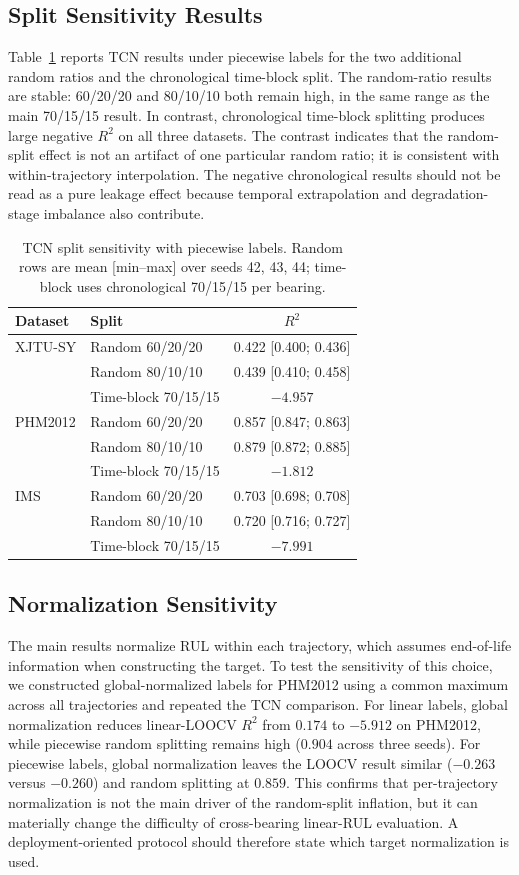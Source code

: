 \documentclass[pdflatex,sn-mathphys-num]{sn-jnl}
\begin{document}
\subsection{Split Sensitivity Results}
Table~\ref{tab:sensitivity} reports TCN results under piecewise labels for the two additional random ratios and the chronological time-block split. The random-ratio results are stable: 60/20/20 and 80/10/10 both remain high, in the same range as the main 70/15/15 result. In contrast, chronological time-block splitting produces large negative $R^2$ on all three datasets. The contrast indicates that the random-split effect is not an artifact of one particular random ratio; it is consistent with within-trajectory interpolation. The negative chronological results should not be read as a pure leakage effect because temporal extrapolation and degradation-stage imbalance also contribute.

\begin{table}[t]
\centering
\caption{TCN split sensitivity with piecewise labels. Random rows are mean [min--max] over seeds 42, 43, 44; time-block uses chronological 70/15/15 per bearing.}
\label{tab:sensitivity}
\small
\begin{tabular}{llc}
\toprule
Dataset & Split & $R^2$ \\
\midrule
XJTU-SY & Random 60/20/20 & 0.422 [0.400; 0.436] \\
 & Random 80/10/10 & 0.439 [0.410; 0.458] \\
 & Time-block 70/15/15 & $-4.957$ \\
\midrule
PHM2012 & Random 60/20/20 & 0.857 [0.847; 0.863] \\
 & Random 80/10/10 & 0.879 [0.872; 0.885] \\
 & Time-block 70/15/15 & $-1.812$ \\
\midrule
IMS & Random 60/20/20 & 0.703 [0.698; 0.708] \\
 & Random 80/10/10 & 0.720 [0.716; 0.727] \\
 & Time-block 70/15/15 & $-7.991$ \\
\bottomrule
\end{tabular}
\end{table}


\subsection{Normalization Sensitivity}
The main results normalize RUL within each trajectory, which assumes end-of-life information when constructing the target. To test the sensitivity of this choice, we constructed global-normalized labels for PHM2012 using a common maximum across all trajectories and repeated the TCN comparison. For linear labels, global normalization reduces linear-LOOCV $R^2$ from $0.174$ to $-5.912$ on PHM2012, while piecewise random splitting remains high ($0.904$ across three seeds). For piecewise labels, global normalization leaves the LOOCV result similar ($-0.263$ versus $-0.260$) and random splitting at $0.859$. This confirms that per-trajectory normalization is not the main driver of the random-split inflation, but it can materially change the difficulty of cross-bearing linear-RUL evaluation. A deployment-oriented protocol should therefore state which target normalization is used.
\end{document}
